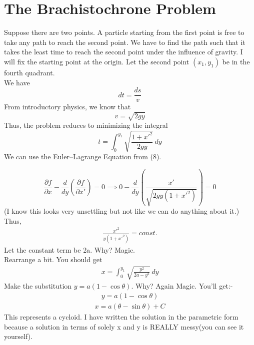 \documentclass[12pt]{article}
\begin{document}
\section{The Brachistochrone Problem}
Suppose there are two points. A particle starting from the first point is free to take any path to reach the second point.
We have to find the path such that it takes the least time to reach the second point under the influence of gravity.
I will fix the starting point at the origin. Let the second point $(x_1,y_1)$ be in the fourth quadrant. \\
We have 
\begin{equation}
    dt = \frac{ds}{v}
\end{equation}
From introductory physics, we know that
\begin{equation}
    v = \sqrt{2gy}
\end{equation}
Thus, the problem reduces to minimizing the integral
\begin{equation}
    t = \int_{0}^{y_1}\sqrt{\frac{1+x'^2}{2gy}}\,dy
\end{equation}
We can use the Euler--Lagrange Equation from (8).

\begin{equation}
\frac{\partial f}{\partial x}
-
\frac{d}{dy}\left(\frac{\partial f}{\partial x'}\right)= 0
\implies
0-\frac{d}{dy}\left(\frac{x'}{\sqrt{2gy(1+x'^2)}}\right)=0
\end{equation}
(I know this looks very unsettling but not like we can do anything about it.)\\
Thus,
\begin{align}
    \frac{x'^2}{y(1+x'^2)}=const.
\end{align}
Let the constant term be 2a. Why? Magic. \\
Rearrange a bit. You should get
\begin{align}
    x=\int_{0}^{y_1}\sqrt{\frac{y^2}{2a-y^2}}\,dy
\end{align}
Make the substitution $y=a(1-\cos\theta)$. Why? Again Magic. You'll get:-
\begin{align}
    y=a(1-\cos\theta)
\end{align}
\begin{align}
    x=a(\theta - \sin\theta)+C
\end{align}
This represents a cycloid. I have written the solution in the parametric form because a solution
in terms of solely x and y is REALLY messy(you can see it yourself).
\end{document}
